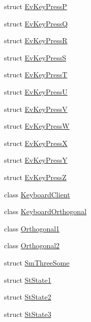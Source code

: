 \begin{DoxyCompactItemize}
\item 
struct \hyperlink{structsm__three__some_1_1EvKeyPressP}{Ev\+Key\+PressP}
\item 
struct \hyperlink{structsm__three__some_1_1EvKeyPressQ}{Ev\+Key\+PressQ}
\item 
struct \hyperlink{structsm__three__some_1_1EvKeyPressR}{Ev\+Key\+PressR}
\item 
struct \hyperlink{structsm__three__some_1_1EvKeyPressS}{Ev\+Key\+PressS}
\item 
struct \hyperlink{structsm__three__some_1_1EvKeyPressT}{Ev\+Key\+PressT}
\item 
struct \hyperlink{structsm__three__some_1_1EvKeyPressU}{Ev\+Key\+PressU}
\item 
struct \hyperlink{structsm__three__some_1_1EvKeyPressV}{Ev\+Key\+PressV}
\item 
struct \hyperlink{structsm__three__some_1_1EvKeyPressW}{Ev\+Key\+PressW}
\item 
struct \hyperlink{structsm__three__some_1_1EvKeyPressX}{Ev\+Key\+PressX}
\item 
struct \hyperlink{structsm__three__some_1_1EvKeyPressY}{Ev\+Key\+PressY}
\item 
struct \hyperlink{structsm__three__some_1_1EvKeyPressZ}{Ev\+Key\+PressZ}
\item 
class \hyperlink{classsm__three__some_1_1KeyboardClient}{Keyboard\+Client}
\item 
class \hyperlink{classsm__three__some_1_1KeyboardOrthogonal}{Keyboard\+Orthogonal}
\item 
class \hyperlink{classsm__three__some_1_1Orthogonal1}{Orthogonal1}
\item 
class \hyperlink{classsm__three__some_1_1Orthogonal2}{Orthogonal2}
\item 
struct \hyperlink{structsm__three__some_1_1SmThreeSome}{Sm\+Three\+Some}
\item 
struct \hyperlink{structsm__three__some_1_1StState1}{St\+State1}
\item 
struct \hyperlink{structsm__three__some_1_1StState2}{St\+State2}
\item 
struct \hyperlink{structsm__three__some_1_1StState3}{St\+State3}
\end{DoxyCompactItemize}
